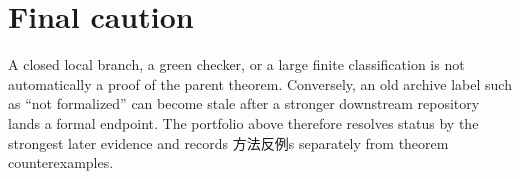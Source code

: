 \documentclass[11pt,a4paper]{ctexart}
\begin{document}
\section{Final caution}

A closed local branch, a green checker, or a large finite classification is not automatically a proof of the parent theorem. Conversely, an old archive label such as ``not formalized'' can become stale after a stronger downstream repository lands a formal endpoint. The portfolio above therefore resolves status by the strongest later evidence and records 方法反例s separately from theorem counterexamples.
\end{document}
